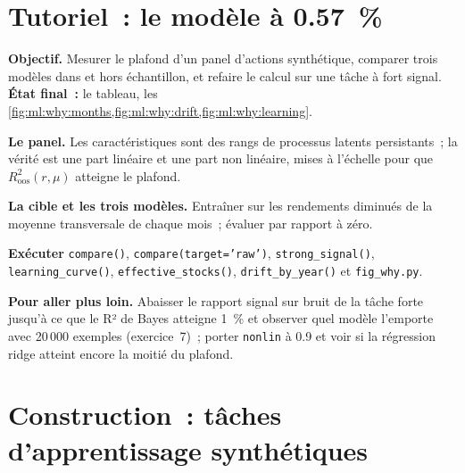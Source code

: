 \section{Tutoriel~: le modèle à 0.57~\%}\label{tut:ml:why-financial-machine-learning-is-different:tut}

\begin{tutorial}
\textbf{Objectif.} Mesurer le plafond d'un panel d'actions synthétique, comparer trois modèles dans et hors échantillon, et refaire le calcul sur
une tâche à fort signal. \textbf{État final~:} le tableau, les \cref{fig:ml:why:months,fig:ml:why:drift,fig:ml:why:learning}.
\begin{tutsteps}
\item \textbf{Le panel.} Les caractéristiques sont des rangs de processus latents persistants~; la vérité est une part linéaire et une
part non linéaire, mises à l'échelle pour que $R^2_{\mathrm{oos}}(r,\mu)$ atteigne le plafond.
\label{lst:ml:why:panel}
\item \textbf{La cible et les trois modèles.} Entraîner sur les rendements diminués de la moyenne transversale de chaque mois~; évaluer par rapport à
zéro.
\label{lst:ml:why:compare}
\item \textbf{Exécuter} \texttt{compare()}, \texttt{compare(target='raw')}, \texttt{strong\_signal()},
\texttt{learning\_curve()}, \texttt{effective\_stocks()}, \texttt{drift\_by\_year()} et \texttt{fig\_why.py}.
\end{tutsteps}
\textbf{Pour aller plus loin.} Abaisser le rapport signal sur bruit de la tâche forte jusqu'à ce que le R² de Bayes atteigne 1~\% et observer
quel modèle l'emporte avec 20\,000 exemples (exercice~7)~; porter
\texttt{nonlin} à 0.9 et voir si la régression ridge atteint encore la moitié du plafond.
\end{tutorial}

\section{Construction~: tâches d'apprentissage synthétiques}\label{bld:ml:why-financial-machine-learning-is-different:mlsynth}


